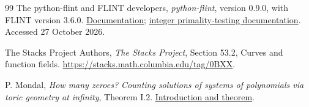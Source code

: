 \documentclass[11pt]{article}
\theoremstyle{definition}
\theoremstyle{remark}
\begin{document}
\begin{thebibliography}{99}
The python-flint and FLINT developers,
\emph{python-flint}, version 0.9.0, with FLINT version 3.6.0.
\href{https://python-flint.readthedocs.io/}{Documentation};
\href{https://flintlib.org/doc/fmpz.html}{integer primality-testing documentation}.
Accessed 27 October 2026.

The Stacks Project Authors,
\emph{The Stacks Project}, Section 53.2, Curves and function fields.
\url{https://stacks.math.columbia.edu/tag/0BXX}.

P. Mondal,
\emph{How many zeroes? Counting solutions of systems of polynomials
via toric geometry at infinity}, Theorem I.2.
\href{https://pinakimondal.org/books/p1_to_16.pdf}{Introduction and theorem}.

\end{thebibliography}
\end{document}
